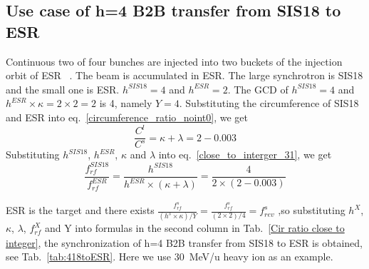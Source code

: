 \subsection{Use case of h=4 B2B transfer from SIS18 to ESR} 
Continuous two of four bunches are injected into two buckets of the injection orbit of ESR ~\cite{steck_demonstration_2011}. The beam is accumulated in ESR. The large synchrotron is SIS18 and the small one is ESR. $h^{\mathit{SIS18}}=4$ and $h^{\mathit{ESR}}=2$. The GCD of $h^{\mathit{SIS18}}=4$ and $h^{\mathit{ESR}}\times \kappa=2\times 2=2$ is 4, namely $Y=4$. Substituting the circumference of SIS18 and ESR into eq.~\ref{circumference_ratio_noint0}, we get
\begin{equation}
\frac{C^l}{C^s}=\kappa + \lambda =2-0.003
\end{equation}
Substituting $h^{\mathit{SIS18}}$, $h^{\mathit{ESR}}$, $\kappa$ and $\lambda$ into eq.~\ref{close_to_interger_31}, we get
\begin{equation}
\frac {f_{\mathit{rf}}^{\mathit{SIS18}}}{f_{\mathit{rf}}^{\mathit{ESR}}}= \frac{h^{\mathit{SIS18}}}{h^{\mathit{ESR}} \times (\kappa+ \lambda)}=\frac {4}{2 \times(2-0.003)}
\end{equation}

ESR is the target and there exists $\frac{f_{\mathit{rf}}^{s}}{(h^s \times\kappa)/Y}=\frac{f_{\mathit{rf}}^{s}}{(2 \times2)/4}=f_{\mathit{rev}}^{s}$ ,so substituting $h^X$, $\kappa$, $\lambda$, $f_{\mathit{rf}}^{X}$ and Y into formulas in the second column in Tab.~\ref{Cir ratio close to integer}, the synchronization of h=4 B2B transfer from SIS18 to ESR is obtained, see Tab.~\ref{tab:418toESR}. Here we use \SI{30}{MeV/\atomicmassunit} heavy ion as an example. 


